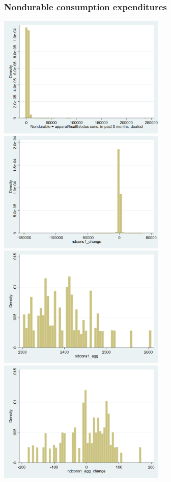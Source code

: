 \documentclass[12pt,a4paper]{article}
\begin{document}
\subsubsection*{Nondurable consumption expenditures}
\begin{center}
\includegraphics[width=8cm]{graphs/ndcons1.png}
\includegraphics[width=8cm]{graphs/ndcons1_change.png}\\
\includegraphics[width=8cm]{graphs/ndcons1_agg.png}
\includegraphics[width=8cm]{graphs/ndcons1_agg_change.png}\\

\end{center}
\end{document}
